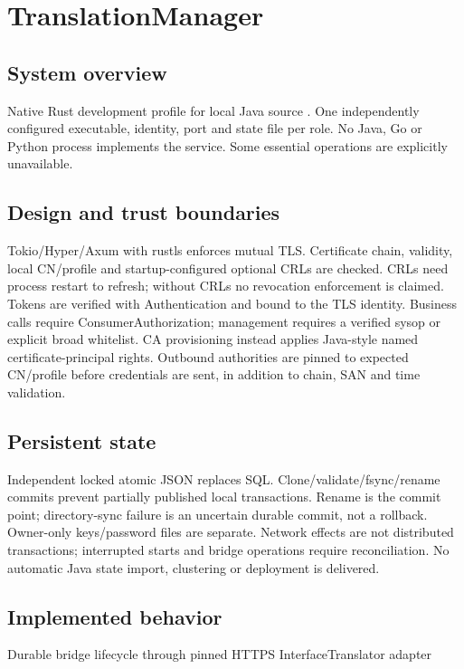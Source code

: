 \documentclass[a4paper]{arrowhead}
\begin{document}
\ArrowheadSetup
\section{TranslationManager}
\subsection{System overview}
Native Rust development profile for local Java source . One independently configured executable, identity, port and state file per role. No Java, Go or Python process implements the service. Some essential operations are explicitly unavailable.
\subsection{Design and trust boundaries}
Tokio/Hyper/Axum with rustls enforces mutual TLS. Certificate chain, validity, local CN/profile and startup-configured optional CRLs are checked. CRLs need process restart to refresh; without CRLs no revocation enforcement is claimed. Tokens are verified with Authentication and bound to the TLS identity. Business calls require ConsumerAuthorization; management requires a verified sysop or explicit broad whitelist. CA provisioning instead applies Java-style named certificate-principal rights. Outbound authorities are pinned to expected CN/profile before credentials are sent, in addition to chain, SAN and time validation.
\subsection{Persistent state}
Independent locked atomic JSON replaces SQL. Clone/validate/fsync/rename commits prevent partially published local transactions. Rename is the commit point; directory-sync failure is an uncertain durable commit, not a rollback. Owner-only keys/password files are separate. Network effects are not distributed transactions; interrupted starts and bridge operations require reconciliation. No automatic Java state import, clustering or deployment is delivered.
\subsection{Implemented behavior}
Durable bridge lifecycle through pinned HTTPS InterfaceTranslator adapter
\end{document}
